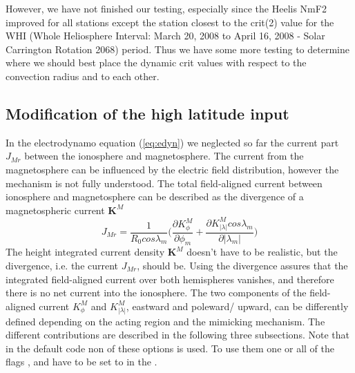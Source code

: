However, we have not finished our testing, especially since the Heelis NmF2 improved for all 
stations except the station closest to the crit(2) value for the WHI 
(Whole Heliosphere Interval: March 20, 2008 to April 16, 2008 - Solar Carrington Rotation 2068) 
period.  
Thus we have some more testing to determine where we should best place the dynamic crit values 
with respect to the convection radius and to each other.
%
\subsection{Modification of the high latitude input}
%
In the electrodynamo equation (\ref{eq:edyn}) we neglected so far the
 current part $J_{Mr}$ between the ionosphere and magnetosphere. The current
from the magnetosphere can be influenced by the electric field
distribution, however the mechanism is not fully understood. The total field-aligned
current between ionosphere and magnetosphere can be described as the divergence
of a magnetospheric current $\mathbf{K}^M$
%
\begin{equation}
   {J}_{Mr}  = \frac{1}{R_0 cos \lambda_m} \bigl(
    \frac{\partial K_{\phi}^M}{\partial \phi_m} + 
    \frac{\partial K_{|\lambda|}^M cos \lambda_m}{\partial | \lambda_m| } \bigr) 
    \label{eq:magcurrent}
\end{equation}
%
The height integrated current density $\mathbf{K}^M$ doesn't have 
to be realistic, but the divergence, i.e. the current $J_{Mr}$,
should be. Using the divergence assures that the integrated field-aligned
current over both hemispheres vanishes, and therefore there is no net current into the
ionosphere. The two components of the field-aligned
current $K_{\phi}^M$ and $K_{|\lambda|}^M$, eastward and poleward/ upward, 
can be differently defined depending on the acting region and the
mimicking mechanism. The different contributions 
are described in the following three subsections. Note that in the
default code non of these options is used. To use them one or all
of the flags
,  and  have to be set to 
 in the  .
